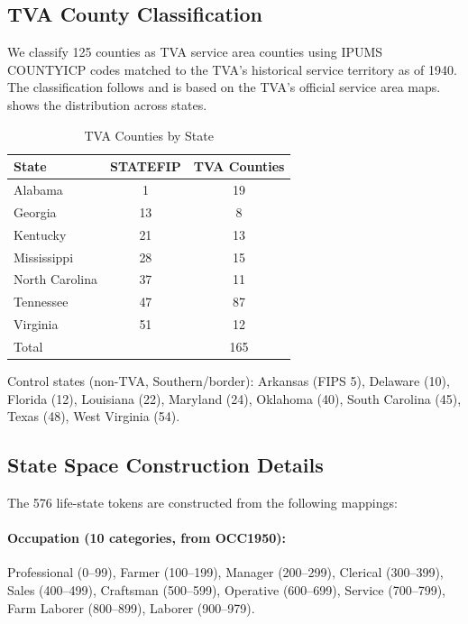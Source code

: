 \documentclass[12pt]{article}
\begin{document}
\subsection{TVA County Classification}

We classify 125 counties as TVA service area counties using IPUMS COUNTYICP codes matched to the TVA's historical service territory as of 1940. The classification follows \citet{klineMoretti2014local} and is based on the TVA's official service area maps.  shows the distribution across states.

\begin{table}[H]
\centering
\caption{TVA Counties by State}
\label{tab:tva_county_counts}
\begin{tabular}{lcc}
\toprule
State & STATEFIP & TVA Counties \\
\midrule
Alabama & 1 & 19 \\
Georgia & 13 & 8 \\
Kentucky & 21 & 13 \\
Mississippi & 28 & 15 \\
North Carolina & 37 & 11 \\
Tennessee & 47 & 87 \\
Virginia & 51 & 12 \\
\midrule
Total & & 165 \\
\bottomrule
\end{tabular}
\end{table}

Control states (non-TVA, Southern/border): Arkansas (FIPS 5), Delaware (10), Florida (12), Louisiana (22), Maryland (24), Oklahoma (40), South Carolina (45), Texas (48), West Virginia (54).

\subsection{State Space Construction Details}

The 576 life-state tokens are constructed from the following mappings:

\paragraph{Occupation (10 categories, from OCC1950):}
Professional (0--99), Farmer (100--199), Manager (200--299), Clerical (300--399), Sales (400--499), Craftsman (500--599), Operative (600--699), Service (700--799), Farm Laborer (800--899), Laborer (900--979).
\end{document}
